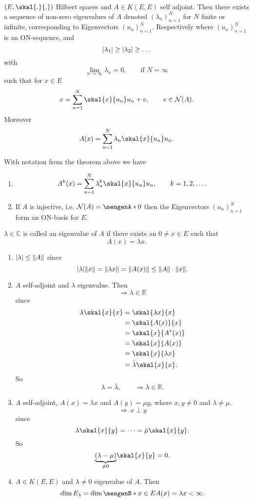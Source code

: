 \begin{theorem}
	$(E, \skal{.}{.})$ Hilbert spaces and $A \in K(E,E)$ self adjoint. Then there exists a sequence of non-zero eigenvalues of $A$ denoted
	$(\lambda_n)_{n=1}^{N}$ for $N$ finite or infinite, corresponding to Eigenvectors $(u_n)_{n=1}^{N}$. Respectively where $(u_n)_{n=1}^{N}$ is an ON-sequence, and
	\[
		\lvert\lambda_1\rvert \geq \lvert\lambda_2\rvert \geq \dots
	\]
	with 
	\[
		\lim_{n \to \infty} \lambda_n = 0, \qquad \text{if } N= \infty
	\]
	such that for $x \in E$
	\[
		x = \sum_{n=1}^{N}\skal{x}{u_n}u_n +v, \qquad v \in \mathcal{N}(A).
	\]
	Moreover
	\[
		A(x) = \sum_{n=1}^{N} \lambda_n \skal{x}{u_n}u_n.
	\]
\end{theorem}
\begin{bemerkung}
	With notation from the theorem above we have
	\begin{enumerate}
		\item \[
		A^k(x) = \sum_{n=1}^{N} \lambda_n^k \skal{x}{u_n}u_n, \qquad k=1,2,\dots.
	\]
	\item If $A$ is injective, i.e. $\mathcal{N}(A) = \set{0}$ then the Eigenvectors $(u_n)_{n=1}^{N}$ form an ON-basis for $E$.
	\end{enumerate}
\end{bemerkung}
\begin{definition*}
	$\lambda \in \mathbb{C}$ is called an eigenvalue of $A$ if there exists an $0 \neq x \in E$ such that
	\[
		A(x) = \lambda x.
	\]
\end{definition*}
\begin{bemerkung}
	\begin{enumerate}
		\item $\abs{\lambda} \leq \norm{A}$ since
		\[
			\abs{\lambda} \norm{x} =\norm{\lambda x} = \norm{A(x)} \leq \norm{A} \cdot \norm{x}.
		\]
		\item $A$ self-adjoint and $\lambda$ eigenvalue. Then
		\[
			\Rightarrow \lambda \in \mathbb{R}
		\]
		since
		\begin{align*}
			\lambda \skal{x}{x} &= \skal{\lambda x}{x} \\ &= \skal{A(x)}{x} \\ &= \skal{x}{A^*(x)} \\ &= \skal{x}{A(x)} \\ &= \skal{x}{\lambda x} \\ & = \bar{\lambda} \skal{x}{x}.
		\end{align*}
		So \[
			\lambda = \bar{\lambda}, \qquad \Rightarrow \lambda \in \mathbb{R}.
		\]
		\item $A$ self-adjoint, $A(x) = \lambda x$ and $A(y) = \mu y$, where $x,y \neq 0$ and $\lambda \neq  \mu $.
		\[
			\Rightarrow \,x \perp y
		\]
		since
		\[
			\lambda \skal{x}{y} = \dots = \bar{\mu} \skal{x}{y}.
		\]
		So
		\[
			\underset{\neq 0}{\underbrace{( \lambda - \mu)}}\skal{x}{y} = 0.
		\]
		\item $A \in K(E,E)$ and $\lambda \neq 0$ eigenvalue of $A$. Then
		\[
			\dim E_\lambda = \dim \set[x \in E]{A(x)= \lambda x} < \infty. 
		\]
	\end{enumerate}
\end{bemerkung}
